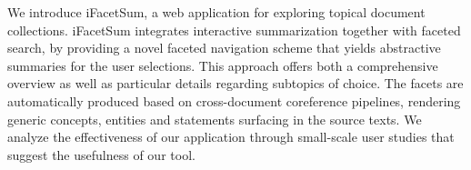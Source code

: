 We introduce iFacetSum, a web application for  exploring  topical  document  collections. iFacetSum integrates interactive summarization together with faceted search, by providing a novel faceted navigation scheme that yields abstractive summaries for the user selections. This  approach  offers  both  a  comprehensive overview  as well as particular  details regarding subtopics of choice. The facets are automatically produced based on cross-document coreference  pipelines, rendering  generic  concepts, entities and statements surfacing in the source texts. We analyze the effectiveness of our application through small-scale user studies that suggest the usefulness of our tool.